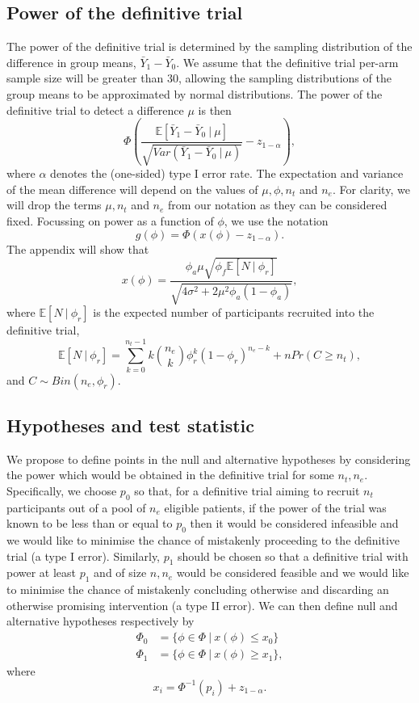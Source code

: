 \documentclass[AMA,STIX1COL]{WileyNJD-v2}
\begin{document}
\subsection{Power of the definitive trial}\label{sec:power}

The power of the definitive trial is determined by the sampling distribution of the difference in group means, $\bar{Y}_1 - \bar{Y}_0$. We assume that the definitive trial per-arm sample size will be greater than 30, allowing the sampling distributions of the group means to be approximated by normal distributions. The power of the definitive trial to detect a difference $\mu$ is then
$$
\Phi \left(\frac{\mathbb{E}[\bar{Y}_1 - \bar{Y}_0 ~|~ \mu]}{\sqrt{Var(\bar{Y}_1 - \bar{Y}_0 ~|~ \mu)}} - z_{1-\alpha} \right),
$$
where $\alpha$ denotes the (one-sided) type I error rate. The expectation and variance of the mean difference will depend on the values of $\mu, \phi, n_t$ and $n_e$. For clarity, we will drop the terms $\mu, n_t$ and $n_e$ from our notation as they can be considered fixed. Focussing on power as a function of $\phi$, we use the notation
$$
g(\phi) = \Phi \left( x(\phi) - z_{1-\alpha} \right).
$$
The appendix will show that
$$
x(\phi) =  \frac{ \phi_a\mu \sqrt{\phi_f \mathbb{E}[N ~|~ \phi_r]} } {\sqrt{4\sigma^2 + 2 \mu^2 \phi_a(1-\phi_a)}},
$$
where $\mathbb{E}[N ~|~ \phi_r]$ is the expected number of participants recruited into the definitive trial,
$$
\mathbb{E}[N ~|~ \phi_r] = \sum_{k=0}^{n_t-1} k{n_e \choose k} \phi_r^k (1-\phi_r)^{n_e - k} + n Pr(C \geq n_t),
$$
and $C \sim Bin(n_e, \phi_r)$.

\subsection{Hypotheses and test statistic}

We propose to define points in the null and alternative hypotheses by considering the power which would be obtained in the definitive trial for some $n_t, n_e$. Specifically, we choose $p_0$ so that, for a definitive trial aiming to recruit $n_t$ participants out of a pool of $n_e$ eligible patients, if the power of the trial was known to be less than or equal to $p_0$ then it would be considered infeasible and we would like to minimise the chance of mistakenly proceeding to the definitive trial (a type I error). Similarly, $p_1$ should be chosen so that a definitive trial with power at least $p_1$ and of size $n, n_e$ would be considered feasible and we would like to minimise the chance of mistakenly concluding otherwise and discarding an otherwise promising intervention (a type II error). We can then define null and alternative hypotheses respectively by
\begin{align*}
\Phi_0 &= \{\phi \in \Phi ~ | ~ x(\phi) \leq x_0 \} \\
\Phi_1 &= \{\phi \in \Phi ~ | ~ x(\phi) \geq x_1 \},
\end{align*}
where
$$
x_i = \Phi^{-1}(p_i) + z_{1-\alpha}.
$$
\end{document}
